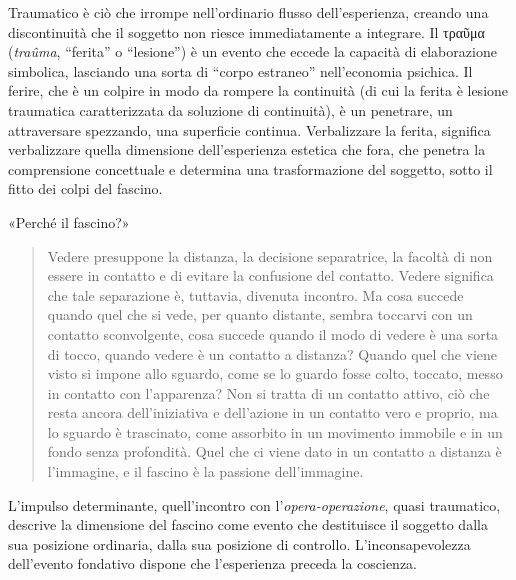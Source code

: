 Traumatico è ciò che irrompe nell'ordinario flusso dell'esperienza, creando una
discontinuità che il soggetto non riesce immediatamente a integrare. Il
\textgreek{τραῦμα} (\emph{traûma}, “ferita” o “lesione”)
è un evento che eccede la capacità di elaborazione simbolica, lasciando una
sorta di “corpo estraneo” nell'economia psichica. Il ferire, che è un colpire in
modo da rompere la continuità (di cui la ferita è lesione traumatica
caratterizzata da soluzione di continuità), è un penetrare, un attraversare
spezzando, una superficie continua. Verbalizzare la ferita, significa verbalizzare quella dimensione dell'esperienza
estetica che fora, che penetra la comprensione concettuale e determina una
trasformazione del soggetto, sotto il fitto dei colpi del fascino.

«Perché il fascino?» \cite{blanchot82}

\begin{quote}
  \begin{sf}
    \small
    Vedere presuppone la distanza, la decisione separatrice, la facoltà di non
    essere in contatto e di evitare la confusione del contatto. Vedere significa
    che tale separazione è, tuttavia, divenuta incontro. Ma cosa succede quando
    quel che si vede, per quanto distante, sembra toccarvi con un contatto
    sconvolgente, cosa succede quando il modo di vedere è una sorta di tocco,
    quando vedere è un contatto a distanza? Quando quel che viene visto si
    impone allo sguardo, come se lo guardo fosse colto, toccato, messo in
    contatto con l’apparenza? Non si tratta di un contatto attivo, ciò che resta
    ancora dell’iniziativa e dell’azione in un contatto vero e proprio, ma lo
    sguardo è trascinato, come assorbito in un movimento immobile e in un fondo
    senza profondità. Quel che ci viene dato in un contatto a distanza è
    l’immagine, e il fascino è la passione dell’immagine.
  \end{sf}
\end{quote}

L'impulso determinante, quell'incontro con l'\emph{opera-operazione}, quasi traumatico,
descrive la dimensione del fascino come evento che destituisce il soggetto dalla
sua posizione ordinaria, dalla sua posizione di controllo. L'inconsapevolezza
dell'evento fondativo dispone che l'esperienza preceda la coscienza.%

